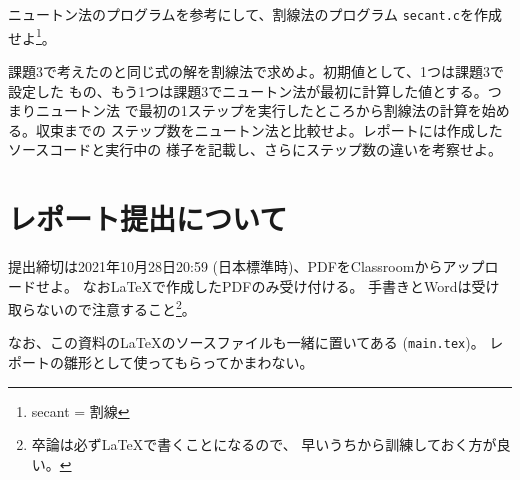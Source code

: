 \documentclass[a4paper]{jsarticle}
\begin{document}
ニュートン法のプログラムを参考にして、割線法のプログラム
\texttt{secant.c}を作成せよ\footnote{secant = 割線}。

課題3で考えたのと同じ式の解を割線法で求めよ。初期値として、1つは課題3で設定した
もの、もう1つは課題3でニュートン法が最初に計算した値とする。つまりニュートン法
で最初の1ステップを実行したところから割線法の計算を始める。収束までの
ステップ数をニュートン法と比較せよ。レポートには作成したソースコードと実行中の
様子を記載し、さらにステップ数の違いを考察せよ。

\section*{レポート提出について}

提出締切は2021年10月28日20:59 (日本標準時)、PDFをClassroomからアップロードせよ。
なお\LaTeX で作成したPDFのみ受け付ける。
手書きとWordは受け取らないので注意すること\footnote{卒論は必ず\LaTeX で書くことになるので、
早いうちから訓練しておく方が良い。}。

なお、この資料の\LaTeX のソースファイルも一緒に置いてある (\texttt{main.tex})。
レポートの雛形として使ってもらってかまわない。
\end{document}
